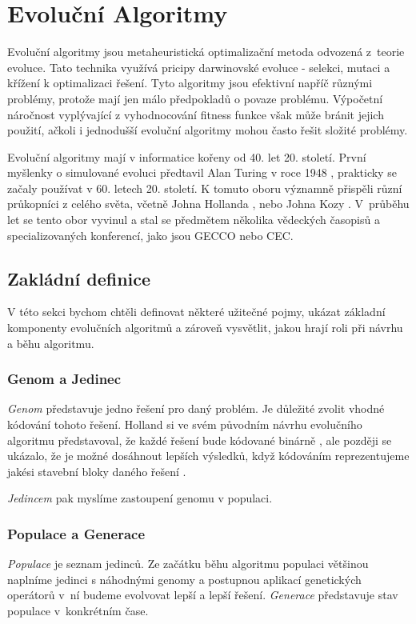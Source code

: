 \chapter{Evoluční Algoritmy}

Evoluční algoritmy jsou metaheuristická optimalizační metoda odvozená z~teorie evoluce. Tato technika využívá pricipy darwinovské evoluce - selekci, mutaci a křížení k optimalizaci řešení. Tyto algoritmy jsou efektivní napříč různými problémy, protože mají jen málo předpokladů o povaze problému. Výpočetní náročnost vyplývající z vyhodnocování fitness funkce však může bránit jejich použití, ačkoli i jednodušší evoluční algoritmy mohou často řešit složité problémy.

Evoluční algoritmy mají v informatice kořeny od 40. let 20. století. První myšlenky o simulované evoluci předtavil Alan Turing v roce 1948 \cite{Turing1948}, prakticky se začaly používat v 60. letech 20. století. K tomuto oboru významně přispěli různí průkopníci z celého světa, včetně Johna Hollanda \cite{Holland1992}, nebo Johna Kozy \cite{Koza1994}. V~průběhu let se tento obor vyvinul a stal se předmětem několika vědeckých časopisů a specializovaných konferencí, jako jsou GECCO nebo CEC. 

\section{Zakládní definice}
V této sekci bychom chtěli definovat některé užitečné pojmy, ukázat základní komponenty evolučních algoritmů a zároveň vysvětlit, jakou hrají roli při návrhu a běhu algoritmu.

\subsection{Genom a Jedinec}
\emph{Genom} představuje jedno řešení pro daný problém. Je důležité zvolit vhodné kódování tohoto řešení. Holland si ve svém původním návrhu evolučního algoritmu představoval, že každé řešení bude kódované binárně \cite{Holland1992}, ale později se ukázalo, že je možné dosáhnout lepších výsledků, když kódováním reprezentujeme jakési stavební bloky daného řešení \cite{Jones1995Crossover}.

\emph{Jedincem} pak myslíme zastoupení genomu v populaci.

\subsection{Populace a Generace}
\emph{Populace} je seznam jedinců. Ze začátku běhu algoritmu populaci většinou naplníme jedinci s náhodnými genomy a postupnou aplikací genetických operátorů v~ní budeme evolvovat lepší a lepší řešení. \emph{Generace} představuje stav populace v~konkrétním čase.

